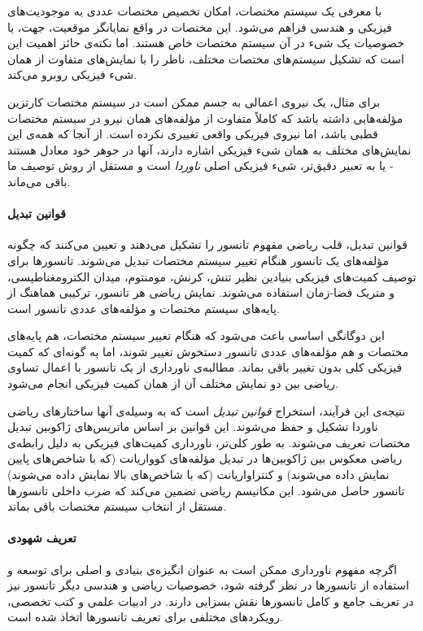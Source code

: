 با معرفی یک سیستم مختصات، امکان تخصیص مختصات عددی به موجودیت‌های فیزیکی و هندسی فراهم می‌شود. این مختصات در واقع نمایانگر موقعیت، جهت، یا خصوصیات یک شیء در آن سیستم مختصات خاص هستند. اما نکته‌ی حائز اهمیت این است که تشکیل سیستم‌های مختصات مختلف، ناظر را با نمایش‌های متفاوت از همان شیء فیزیکی روبرو می‌کند.

برای مثال، یک نیروی اعمالی به جسم ممکن است در سیستم مختصات کارتزین مؤلفه‌هایی داشته باشد که کاملاً متفاوت از مؤلفه‌های همان نیرو در سیستم مختصات قطبی باشد، اما نیروی فیزیکی واقعی تغییری نکرده است. از آنجا که همه‌ی این نمایش‌های مختلف به همان شیء فیزیکی اشاره دارند، آنها در جوهر خود معادل هستند - یا به تعبیر دقیق‌تر، شیء فیزیکی اصلی \textit{ناوردا} است و مستقل از روش توصیف ما باقی می‌ماند.

\paragraph{قوانین تبدیل} قوانین تبدیل، قلب ریاضی مفهوم تانسور را تشکیل می‌دهند و تعیین می‌کنند که چگونه مؤلفه‌های یک تانسور هنگام تغییر سیستم مختصات تبدیل می‌شوند. تانسورها برای توصیف کمیت‌های فیزیکی بنیادین نظیر تنش، کرنش، مومنتوم، میدان الکترومغناطیسی، و متریک فضا-زمان استفاده می‌شوند. نمایش ریاضی هر تانسور، ترکیبی هماهنگ از پایه‌های سیستم مختصات و مؤلفه‌های عددی تانسور است.

این دوگانگی اساسی باعث می‌شود که هنگام تغییر سیستم مختصات، هم پایه‌های مختصات و هم مؤلفه‌های عددی تانسور دستخوش تغییر شوند، اما به گونه‌ای که کمیت فیزیکی کلی بدون تغییر باقی بماند. مطالبه‌ی ناورداری از یک تانسور با اعمال تساوی ریاضی بین دو نمایش مختلف آن از همان کمیت فیزیکی انجام می‌شود.

نتیجه‌ی این فرآیند، استخراج \textit{قوانین تبدیل} است که به وسیله‌ی آنها ساختارهای ریاضی ناوردا تشکیل و حفظ می‌شوند. این قوانین بر اساس ماتریس‌های ژاکوبین تبدیل مختصات تعریف می‌شوند. به طور کلی‌تر، ناورداری کمیت‌های فیزیکی به دلیل رابطه‌ی ریاضی معکوس بین ژاکوبین‌ها در تبدیل مؤلفه‌های کوواریانت (که با شاخص‌های پایین نمایش داده می‌شوند) و کنتراواریانت (که با شاخص‌های بالا نمایش داده می‌شوند) تانسور حاصل می‌شود. این مکانیسم ریاضی تضمین می‌کند که ضرب داخلی تانسورها مستقل از انتخاب سیستم مختصات باقی بماند.

\paragraph{تعریف شهودی} اگرچه مفهوم ناورداری ممکن است به عنوان انگیزه‌ی بنیادی و اصلی برای توسعه و استفاده از تانسورها در نظر گرفته شود، خصوصیات ریاضی و هندسی دیگر تانسور نیز در تعریف جامع و کامل تانسورها نقش بسزایی دارند. در ادبیات علمی و کتب تخصصی، رویکردهای مختلفی برای تعریف تانسورها اتخاذ شده است.

